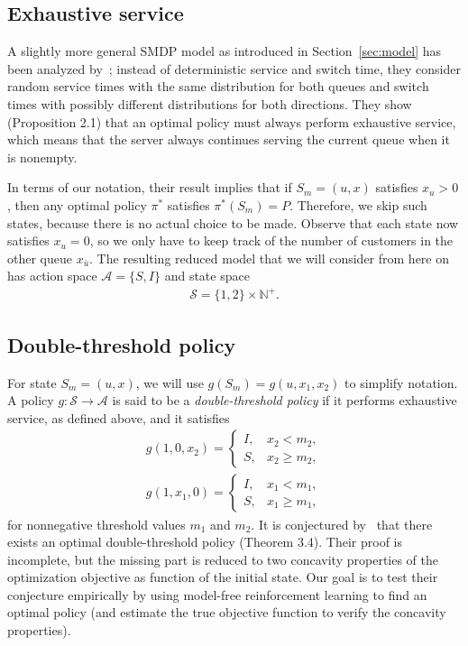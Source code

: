 \documentclass{article}
\theoremstyle{definition}
\theoremstyle{plain}
\begin{document}
\subsection{Exhaustive service}

A slightly more general SMDP model as introduced in Section~\ref{sec:model} has
been analyzed by~\cite{hofriOptimalControlTwo1987}; instead of deterministic
service and switch time, they consider random service times with the same
distribution for both queues and switch times with possibly different
distributions for both directions. They show (Proposition 2.1) that an optimal
policy must always perform exhaustive service, which means that the server
always continues serving the current queue when it is nonempty.

In terms of our notation, their result implies that if $S_{m} = (u, x)$
satisfies $x_{u} > 0$, then any optimal policy $\pi^{*}$ satisfies
$\pi^{*}(S_{m}) = P$. Therefore, we skip such states, because there is no actual
choice to be made. Observe that each state now satisfies $x_{u} = 0$, so we only
have to keep track of the number of customers in the other queue $x_{\bar{u}}$.
The resulting reduced model that we will consider from here on has action space
$\mathcal{A} = \{ S, I \}$ and state space
\begin{align}
  \mathcal{S} = \{1,2\} \times \mathbb{N}^{+} .
\end{align}

\subsection{Double-threshold policy}

For state $S_{m} = (u, x)$, we will use $g(S_{m}) = g(u, x_{1}, x_{2})$ to
simplify notation. A policy $g : \mathcal{S} \rightarrow \mathcal{A}$ is said to
be a \textit{double-threshold policy} if it performs exhaustive service, as
defined above, and it satisfies
\begin{subequations}
\begin{align}
  g(1, 0, x_{2}) = \begin{cases}
                     I, & x_{2} < m_{2} , \\
                     S, & x_{2} \geq m_{2} ,
                    \end{cases} \\
  g(1, x_{1}, 0) = \begin{cases}
                     I, & x_{1} < m_{1} , \\
                     S, & x_{1} \geq m_{1} ,
                    \end{cases}
\end{align}
\end{subequations}
for nonnegative threshold values $m_{1}$ and $m_{2}$. It is conjectured
by~\cite{hofriOptimalControlTwo1987} that there exists an optimal
double-threshold policy (Theorem 3.4). Their proof is incomplete, but the
missing part is reduced to two concavity properties of the optimization
objective as function of the initial state. Our goal is to test their conjecture
empirically by using model-free reinforcement learning to find an optimal policy
(and estimate the true objective function to verify the concavity properties).
\end{document}
